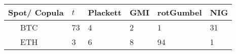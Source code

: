     {\begin{tabularx}{\textwidth}{lYYYYY} \toprule
         Spot/ Copula & $t$ & Plackett & GMI & rotGumbel & NIG \\ \midrule
        \ \ \ BTC          & 73         & 4                 & 2                        & 1                  & 31                  \\
        \ \ \ ETH          & 3          & 6                 & 8                        & 94                 & 1                   \\
    \bottomrule
    \end{tabularx}
       }








